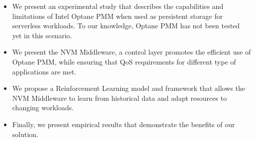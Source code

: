 \begin{itemize}
    \item We present an experimental study that describes the capabilities and limitations of Intel Optane PMM when used as persistent storage for serverless workloads. To our knowledge, Optane PMM has not been tested yet in this scenario.
    \item We present the NVM Middleware, a control layer promotes the efficient use of Optane PMM, while ensuring that QoS requirements for different type of applications are met.
    \item We propose a Reinforcement Learning model and framework that allows the NVM Middleware to learn from historical data and adapt resources to changing workloads.
    \item Finally, we present empirical results that demonstrate the benefits of our solution.
\end{itemize}